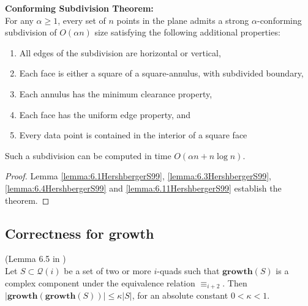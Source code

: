 \textbf{Conforming Subdivision Theorem:} \\
	For any $\alpha\geq 1$, every set of $n$ points in the plane admits a strong
	$\alpha$-conforming subdivision of $O(\alpha n)$ size satisfying the
	following additional properties:
\begin{enumerate}	
	\item All edges of the subdivision are horizontal or vertical,
	\item Each face is either a square of a square-annulus, with subdivided
		boundary,
	\item Each annulus has the minimum clearance property,
	\item Each face has the uniform edge property, and
	\item Every data point is contained in the interior of a square face
\end{enumerate}
	Such a subdivision can be computed in time $O(\alpha n + n\log n)$.

\begin{proof}
Lemma \ref{lemma:6.1HershbergerS99}, \ref{lemma:6.3HershbergerS99}, \ref{lemma:6.4HershbergerS99} and \ref{lemma:6.11HershbergerS99} establish the theorem.
\end{proof}

\subsection{Correctness for \textbf{growth}} \label{section:correctnessgrowth}

\begin{Lemma} (Lemma 6.5 in \cite{HershbergerS99}) \label{lemma:growthgrowthS}\\
Let $S \subset \mathcal{Q}(i)$ be a set of two or more $i$-quads such that $\mathbf{growth}(S)$ is a complex component under the equivalence relation $\equiv_{i+2}$. Then $|\mathbf{growth}(\mathbf{growth}(S))| \leq \kappa|S|$, for an absolute constant $0 < \kappa < 1$.
\end{Lemma}

